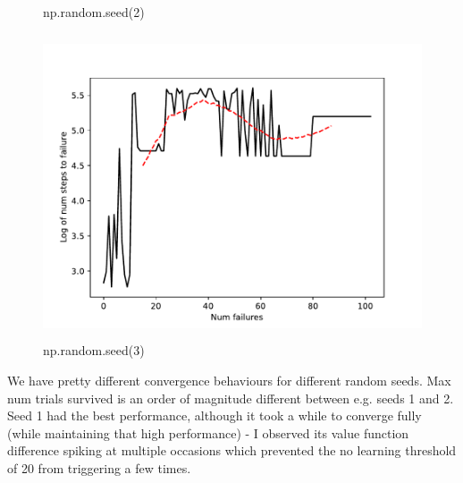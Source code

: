\begin{answer}
\begin{figure}[H]
	\caption{np.random.seed(2)}
\end{figure}
\begin{figure}[H]
	\includegraphics[width=15cm,height=9cm,keepaspectratio]{../src/cartpole/control_seed3.pdf}
	\caption{np.random.seed(3)}
\end{figure}


We have pretty different convergence behaviours for different random seeds. Max num trials survived is an order of magnitude different between e.g. seeds 1 and 2. Seed 1 had the best performance, although it took a while to converge fully (while maintaining that high performance) - I observed its value function difference spiking at multiple occasions which prevented the no learning threshold of 20 from triggering a few times.
\end{answer}
%
